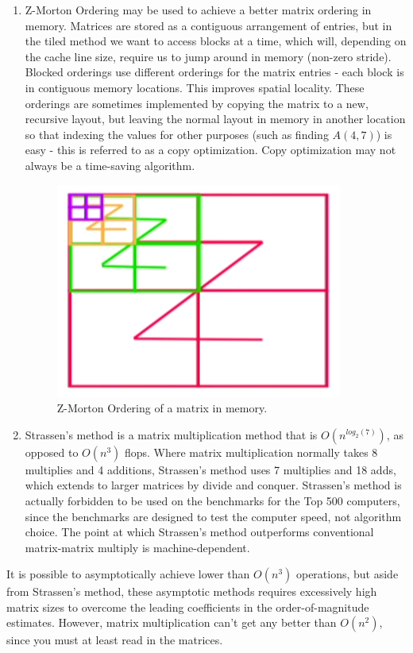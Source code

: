\documentclass[10pt]{article}
\begin{document}
\begin{flushleft}
\begin{enumerate}
\item Z-Morton Ordering may be used to achieve a better matrix ordering in memory. Matrices are stored as a contiguous arrangement of entries, but in the tiled method we want to access blocks at a time, which will, depending on the cache line size, require us to jump around in memory (non-zero stride). Blocked orderings use different orderings for the matrix entries - each block is in contiguous memory locations. This improves spatial locality. These orderings are sometimes implemented by copying the matrix to a new, recursive layout, but leaving the normal layout in memory in another location so that indexing the values for other purposes (such as finding \(A(4,7)\)) is easy - this is referred to as a copy optimization. Copy optimization may not always be a time-saving algorithm.

\begin{figure}[H]
\centering
\includegraphics[width=0.25\linewidth]{figures/Z-morton-ordering.pdf}
\caption{Z-Morton Ordering of a matrix in memory.}
\end{figure}

\item Strassen's method is a matrix multiplication method that is \(O(n^{log_2(7)})\), as opposed to \(O(n^3)\) flops. Where matrix multiplication normally takes 8 multiplies and 4 additions, Strassen's method uses 7 multiplies and 18 adds, which extends to larger matrices by divide and conquer. Strassen's method is actually forbidden to be used on the benchmarks for the Top 500 computers, since the benchmarks are designed to test the computer speed, not algorithm choice. The point at which Strassen's method outperforms conventional matrix-matrix multiply is machine-dependent.

\end{enumerate}

It is possible to asymptotically achieve lower than \(O(n^3)\) operations, but aside from Strassen's method, these asymptotic methods requires excessively high matrix sizes to overcome the leading coefficients in the order-of-magnitude estimates. However, matrix multiplication can't get any better than \(O(n^2)\), since you must at least read in the matrices.


\end{flushleft}
\end{document}
